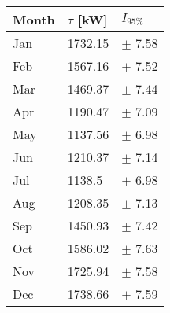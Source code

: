 \begin{tabular}{lll}
\toprule
Month & $\tau$ [kW] &   $I_{95\%}$ \\
\midrule
  Jan &     1732.15 &   $\pm$ 7.58 \\
  Feb &     1567.16 &   $\pm$ 7.52 \\
  Mar &     1469.37 &   $\pm$ 7.44 \\
  Apr &     1190.47 &   $\pm$ 7.09 \\
  May &     1137.56 &   $\pm$ 6.98 \\
  Jun &     1210.37 &   $\pm$ 7.14 \\
  Jul &      1138.5 &   $\pm$ 6.98 \\
  Aug &     1208.35 &   $\pm$ 7.13 \\
  Sep &     1450.93 &   $\pm$ 7.42 \\
  Oct &     1586.02 &   $\pm$ 7.63 \\
  Nov &     1725.94 &   $\pm$ 7.58 \\
  Dec &     1738.66 &   $\pm$ 7.59 \\
\bottomrule
\end{tabular}
